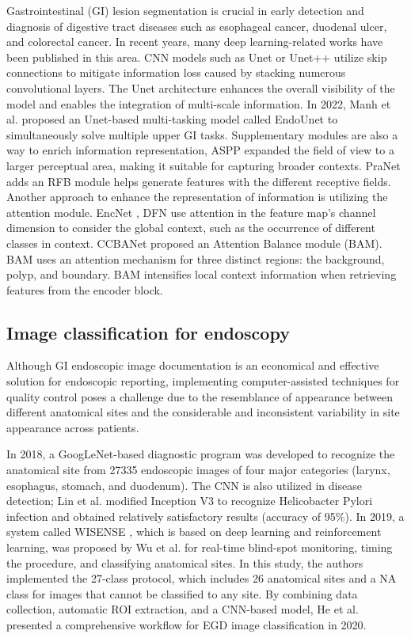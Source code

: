 \documentclass{article}
\begin{document}
Gastrointestinal (GI) lesion segmentation is crucial in early detection and diagnosis of digestive tract diseases such as esophageal cancer, duodenal ulcer, and colorectal cancer. In recent years, many deep learning-related works have been published in this area. CNN models such as Unet \cite{Unet} or Unet++ \cite{Unet++} utilize skip connections to mitigate information loss caused by stacking numerous convolutional layers. The Unet architecture enhances the overall visibility of the model and enables the integration of multi-scale information. In 2022, Manh et al. \cite{manh2022endounet} proposed an Unet-based multi-tasking model called EndoUnet to simultaneously solve multiple upper GI tasks. Supplementary modules are also a way to enrich information representation, ASPP \cite{ASPP} expanded the field of view to a larger perceptual area, making it suitable for capturing broader contexts. PraNet \cite{pranet} adds an RFB module \cite{RFB} helps generate features with the different receptive fields.
Another approach to enhance the representation of information is utilizing the attention module. EncNet \cite{EncNet}, DFN \cite{DFN} use attention in the feature map's channel dimension to consider the global context, such as the occurrence of different classes in context. CCBANet \cite{ccbanet} proposed an Attention Balance module (BAM). BAM uses an attention mechanism for three distinct regions: the background, polyp, and boundary. BAM intensifies local context information when retrieving features from the encoder block.


\subsection{Image classification for endoscopy}
Although GI endoscopic image documentation is an economical and effective solution for endoscopic reporting, implementing computer-assisted techniques for quality control poses a challenge due to the resemblance of appearance between different anatomical sites and the considerable and inconsistent variability in site appearance across patients.

In 2018, a GoogLeNet-based diagnostic program \cite{takiyama2018automatic} was developed to recognize the anatomical site from 27335 endoscopic images of four major categories (larynx, esophagus, stomach, and duodenum). The CNN is also utilized in disease detection; Lin et al. \cite{lin2019helicobacter} modified Inception V3 to recognize Helicobacter Pylori infection and obtained relatively satisfactory results (accuracy of 95\%). In 2019, a system called WISENSE \cite{wu2019randomised}, which is based on deep learning and reinforcement learning, was proposed by Wu et al. for real-time blind-spot monitoring, timing the procedure, and classifying anatomical sites. In this study, the authors implemented the 27-class protocol, which includes 26 anatomical sites and a NA class for images that cannot be classified to any site. By combining data collection, automatic ROI extraction, and a CNN-based model, He et al. \cite{he2020deep} presented a comprehensive workflow for EGD image classification in 2020.
\end{document}
